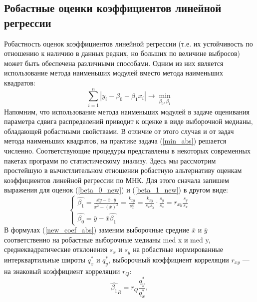 	
	


    \subsection{Робастные оценки коэффициентов линейной регрессии}
    Робастность оценок коэффициентов линейной регрессии (т.е. их устойчивость по отношению к наличию в данных редких, но больших по величине выбросов) может быть обеспечена различными способами. Одним из них является использование метода наименьших модулей вместо метода наименьших квадратов:
    \begin{equation}
	    \sum_{i=1}^{n}{|y_{i} - \beta_{0} - \beta_{1}x_{i}|}\rightarrow \min_{\beta_{0}, \beta_{1}}
	    \label{min_abs}
	\end{equation}
    Напомним, что использование метода наименьших модулей в задаче оценивания параметра сдвига распределений приводит к оценке в виде выборочной медианы, обладающей робастными свойствами. В отличие от этого случая и от задач метода наименьших квадратов, на практике задача (\ref{min_abs}) решается численно. Соответствующие процедуры представлены в некоторых современных пакетах программ по статистическому анализу.
    \newline
    Здесь мы рассмотрим простейшую в вычистлительном отношении робастную альтернативу оценкам коэффициентов линейной регрессии по МНК. Для этого сначала запишем выражения для оценок (\ref{beta_0_new}) и (\ref{beta_1_new}) в другом виде:
    \begin{equation}
    	\begin{cases}
        \hat{\beta_{1}} = \frac{\bar{xy} - \bar{x} \cdot \bar{y}}{\bar{x^{2}} - (\bar{x})^{2}} = \frac{k_{xy}}{s_{x}^{2}} = \frac{k_{xy}}{s_{x}s_{y}} \cdot \frac{s_{y}}{s_{x}} = r_{xy}\frac{s_{y}}{s_{x}} \\         
        \hat{\beta_{0}} = \bar{y} - \bar{x}\hat{\beta_{1}}
        \end{cases}
        \label{new_coef_abs}
    \end{equation}
    В формулах (\ref{new_coef_abs}) заменим выборочные средние $\bar{x}$ и $\bar{y}$ соответственно на робастные выборочные медианы med x и med y, среднеквадратические отклонения $s_{x}$ и $s_{y}$ на робастные нормированные интерквартильные широты $q^{*}_{x}$ и $q^{*}_{y}$, выборочный коэффициент корреляции $r_{xy}$ — на знаковый коэффициент корреляции $r_{Q}$: 
    \begin{equation}
        \hat{\beta_{1}}_{R} = r_{Q}\frac{q^{*}_{y}}{q^{*}_{x}},
        \label{b_1R}
    \end{equation}
